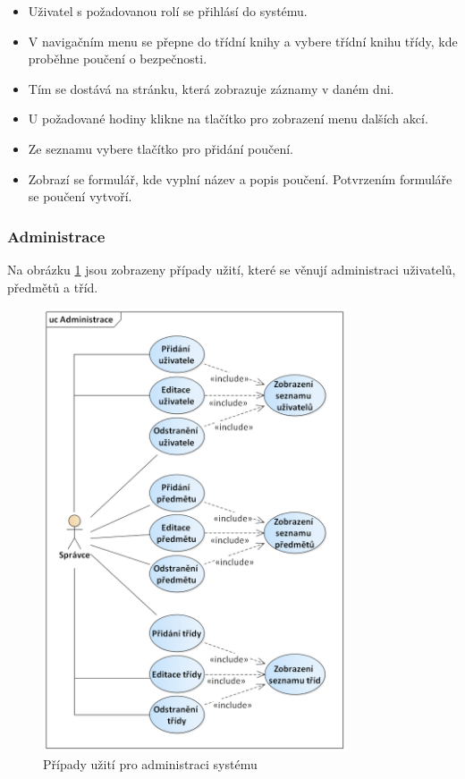 \begin{itemize}
    \item Uživatel s požadovanou rolí se přihlásí do systému.

    \item V navigačním menu se přepne do třídní knihy a vybere třídní knihu třídy, kde proběhne poučení o bezpečnosti.
    \item Tím se dostává na stránku, která zobrazuje záznamy v daném dni.
    \item U požadované hodiny klikne na tlačítko pro zobrazení menu dalších akcí. 
    \item Ze seznamu vybere tlačítko pro přidání poučení.
    \item Zobrazí se formulář, kde vyplní název a popis poučení. Potvrzením formuláře se poučení vytvoří.
\end{itemize}


\subsubsection{Administrace}
Na obrázku \ref{pripady-administrace} jsou zobrazeny případy užití, které se věnují administraci uživatelů, předmětů a tříd.

\begin{figure}[h]
	\centering
	\includegraphics[width=0.80\textwidth]{images/administrace.png}
	\caption{Případy užití pro administraci systému}
	\label{pripady-administrace}
\end{figure}

